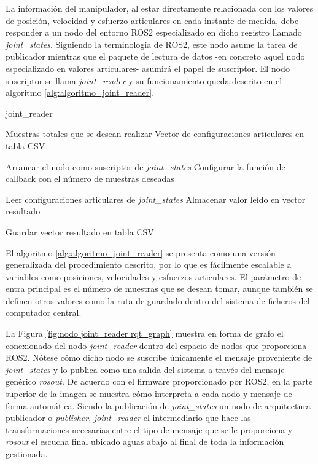 La información del manipulador, al estar directamente relacionada con los valores de posición, velocidad y esfuerzo articulares en cada instante de medida, debe responder a un nodo del entorno ROS2 especializado en dicho registro llamado \textit{joint\_states}. Siguiendo la terminología de ROS2, este nodo asume la tarea de publicador mientras que el paquete de lectura de datos -en concreto aquel nodo especializado en valores articulares- asumirá el papel de suscriptor. El nodo suscriptor se llama \textit{joint\_reader} y su funcionamiento queda descrito en el algoritmo \ref{alg:algoritmo_joint_reader}. 

\begin{algorithm}[H]
\caption{joint\_reader}\label{alg:algoritmo_joint_reader}
\begin{algorithmic}[1]
\Require Muestras totales que se desean realizar
\Ensure Vector de configuraciones articulares en tabla CSV

\State Arrancar el nodo como suscriptor de \textit{joint\_states}
\State Configurar la función de callback con el número de muestras deseadas

    \State Leer configuraciones articulares de \textit{joint\_states}
    \State Almacenar valor leído en vector resultado
\EndWhile

\State Guardar vector resultado en tabla CSV

\end{algorithmic}
\end{algorithm}

El algoritmo \ref{alg:algoritmo_joint_reader} se presenta como una versión generalizada del procedimiento descrito, por lo que es fácilmente escalable a variables como posiciones, velocidades y esfuerzos articulares. El parámetro de entra principal es el número de muestras que se desean tomar, aunque también se definen otros valores como la ruta de guardado dentro del sistema de ficheros del computador central.

La Figura \ref{fig:nodo joint_reader rqt_graph} muestra en forma de grafo el conexionado del nodo \textit{joint\_reader} dentro del espacio de nodos que proporciona ROS2. Nótese cómo dicho nodo se suscribe únicamente el mensaje proveniente de \textit{joint\_states} y lo publica como una salida del sistema a través del mensaje genérico \textit{rosout}. De acuerdo con el firmware proporcionado por ROS2, en la parte superior de la imagen se muestra cómo interpreta a cada nodo y mensaje de forma automática. Siendo la publicación de \textit{joint\_states} un nodo de arquitectura publicador o \textit{publisher}, \textit{joint\_reader} el intermediario que hace las transformaciones necesarias entre el tipo de mensaje que se le proporciona y \textit{rosout} el escucha final ubicado aguas abajo al final de toda la información gestionada.

